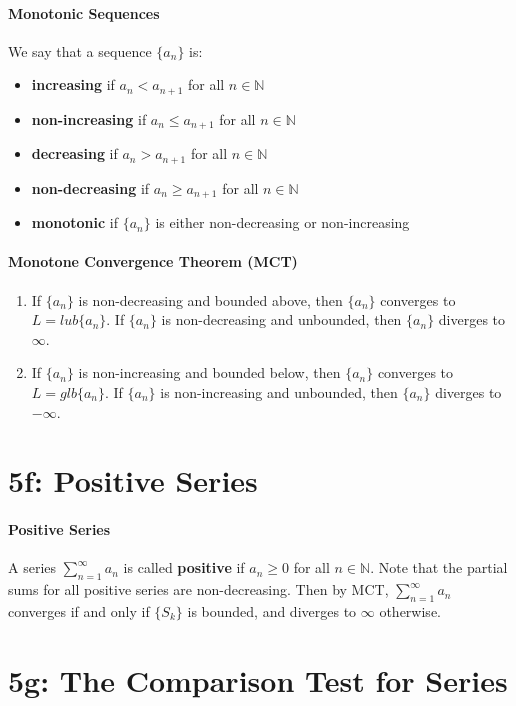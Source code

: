 \documentclass[10pt,letter]{article}
\begin{document}
\paragraph{Monotonic Sequences}
We say that a sequence $\{a_n\}$ is: 
\begin{itemize}
    \item \textbf{increasing} if $a_n<a_{n+1}$ for all $n\in\mathbb{N}$ 
    \item \textbf{non-increasing} if $a_n\leq a_{n+1}$ for all $n\in\mathbb{N}$
    \item \textbf{decreasing} if $a_n>a_{n+1}$ for all $n\in\mathbb{N}$
    \item \textbf{non-decreasing} if $a_n\geq a_{n+1}$ for all $n\in\mathbb{N}$ 
    \item \textbf{monotonic} if $\{a_n\}$ is either non-decreasing or non-increasing
\end{itemize}
\paragraph{Monotone Convergence Theorem (MCT)}
\begin{enumerate}
    \item If $\{a_n\}$ is non-decreasing and bounded above, then $\{a_n\}$ converges to $L=lub\{a_n\}$. If $\{a_n\}$ is non-decreasing and unbounded, then $\{a_n\}$ diverges to $\infty$. 
    \item If $\{a_n\}$ is non-increasing and bounded below, then $\{a_n\}$ converges to $L=glb\{a_n\}$. If $\{a_n\}$ is non-increasing and unbounded, then $\{a_n\}$ diverges to $-\infty$. 
\end{enumerate}


\section*{5f: Positive Series}
\paragraph{Positive Series}
A series $\sum_{n=1}^\infty a_n$ is called \textbf{positive} if $a_n\geq0$ for all $n\in\mathbb{N}$. Note that the partial sums for all positive series are non-decreasing. Then by MCT, $\sum_{n=1}^\infty a_n$ converges if and only if $\{S_k\}$ is bounded, and diverges to $\infty$ otherwise. 

\section*{5g: The Comparison Test for Series}
\end{document}
